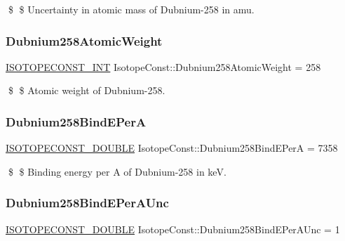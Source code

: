 \$ \$ Uncertainty in atomic mass of Dubnium-\/258 in amu. \mbox{\label{group___isotope_const-_dubnium-_db258_ga02775c945fbd605370d557d8a312cff5}} 
\subsubsection{\texorpdfstring{Dubnium258\+Atomic\+Weight}{Dubnium258AtomicWeight}}
{\footnotesize\ttfamily \mbox{\hyperlink{group___isotope_const-_macros_ga5f18360b3e99483a35c32d789e62621c}{I\+S\+O\+T\+O\+P\+E\+C\+O\+N\+S\+T\+\_\+\+I\+NT}} Isotope\+Const\+::\+Dubnium258\+Atomic\+Weight = 258}

\$ \$ Atomic weight of Dubnium-\/258. \mbox{\label{group___isotope_const-_dubnium-_db258_ga131fdf96368f0be33446ff1853848500}} 
\subsubsection{\texorpdfstring{Dubnium258\+Bind\+E\+PerA}{Dubnium258BindEPerA}}
{\footnotesize\ttfamily \mbox{\hyperlink{group___isotope_const-_macros_ga8f45a7272ce02c0b4c65c44636ed719a}{I\+S\+O\+T\+O\+P\+E\+C\+O\+N\+S\+T\+\_\+\+D\+O\+U\+B\+LE}} Isotope\+Const\+::\+Dubnium258\+Bind\+E\+PerA = 7358}

\$ \$ Binding energy per A of Dubnium-\/258 in keV. \mbox{\label{group___isotope_const-_dubnium-_db258_ga126e82996e2627ccda311c46ea31aa80}} 
\subsubsection{\texorpdfstring{Dubnium258\+Bind\+E\+Per\+A\+Unc}{Dubnium258BindEPerAUnc}}
{\footnotesize\ttfamily \mbox{\hyperlink{group___isotope_const-_macros_ga8f45a7272ce02c0b4c65c44636ed719a}{I\+S\+O\+T\+O\+P\+E\+C\+O\+N\+S\+T\+\_\+\+D\+O\+U\+B\+LE}} Isotope\+Const\+::\+Dubnium258\+Bind\+E\+Per\+A\+Unc = 1}

